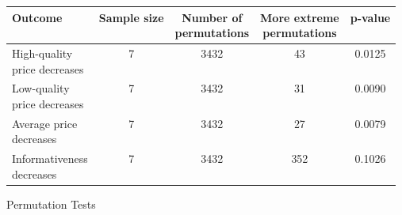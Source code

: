 
\begin{figure}[htbp]
\renewcommand{\arraystretch}{2.5}
\begin{tabular}{lcccc}
\toprule
Outcome & Sample size & \shortstack{Number of\\permutations} & \shortstack{More extreme\\permutations} & p-value \\
\midrule 
\shortstack{High-quality\\price decreases} & 7 & 3432 & 43 & 0.0125 \\
\shortstack{Low-quality\\price decreases} & 7 & 3432 & 31 & 0.0090 \\
\shortstack{Average price\\decreases} & 7 & 3432 & 27 & 0.0079 \\
\shortstack{Informativeness\\decreases} & 7 & 3432 & 352 & 0.1026 \\
\bottomrule
\end{tabular}
\caption{Permutation Tests}
\label{permutation_tests_first}
    
    
\end{figure}
